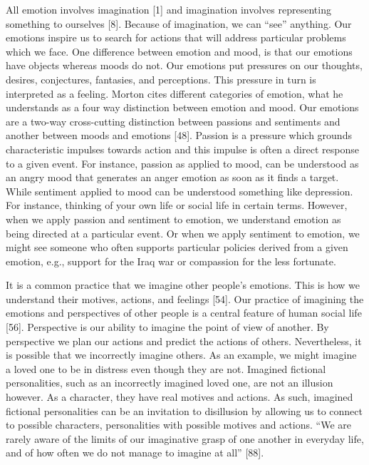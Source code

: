 \documentclass[
  letterpaper,
  DIV=11,
  numbers=noendperiod]{scrartcl}
\theoremstyle{remark}
\begin{document}
All emotion involves imagination {[}1{]} and imagination involves
representing something to ourselves {[}8{]}. Because of imagination, we
can ``see'' anything. Our emotions inspire us to search for actions that
will address particular problems which we face. One difference between
emotion and mood, is that our emotions have objects whereas moods do
not. Our emotions put pressures on our thoughts, desires, conjectures,
fantasies, and perceptions. This pressure in turn is interpreted as a
feeling. Morton cites different categories of emotion, what he
understands as a four way distinction between emotion and mood. Our
emotions are a two-way cross-cutting distinction between passions and
sentiments and another between moods and emotions {[}48{]}. Passion is a
pressure which grounds characteristic impulses towards action and this
impulse is often a direct response to a given event. For instance,
passion as applied to mood, can be understood as an angry mood that
generates an anger emotion as soon as it finds a target. While sentiment
applied to mood can be understood something like depression. For
instance, thinking of your own life or social life in certain terms.
However, when we apply passion and sentiment to emotion, we understand
emotion as being directed at a particular event. Or when we apply
sentiment to emotion, we might see someone who often supports particular
policies derived from a given emotion, e.g., support for the Iraq war or
compassion for the less fortunate.

It is a common practice that we imagine other people's emotions. This is
how we understand their motives, actions, and feelings {[}54{]}. Our
practice of imagining the emotions and perspectives of other people is a
central feature of human social life {[}56{]}. Perspective is our
ability to imagine the point of view of another. By perspective we plan
our actions and predict the actions of others. Nevertheless, it is
possible that we incorrectly imagine others. As an example, we might
imagine a loved one to be in distress even though they are not. Imagined
fictional personalities, such as an incorrectly imagined loved one, are
not an illusion however. As a character, they have real motives and
actions. As such, imagined fictional personalities can be an invitation
to disillusion by allowing us to connect to possible characters,
personalities with possible motives and actions. ``We are rarely aware
of the limits of our imaginative grasp of one another in everyday life,
and of how often we do not manage to imagine at all'' {[}88{]}.
\end{document}
